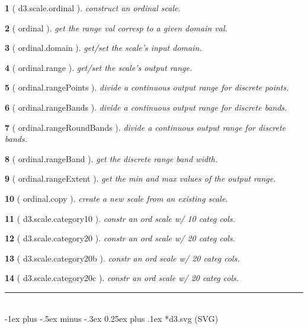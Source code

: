 \documentclass[10pt,landscape,letterpaper]{article}
\makeatletter
\newcounter{thm}
\newcommand{\hdrule}{\vspace{-4pt} \hdashrule[0.25ex]{\fill}{.5pt}{1pt}\vspace{-4pt}}
\theoremstyle{mytheoremstyle}
\newtheorem*{thm}{}
\renewcommand{\section}{\@startsection{section}{1}{0mm}%
                                {-1ex plus -.5ex minus -.3ex}%
                                {0.25ex plus .1ex}%
                                {\normalfont\large\bfseries}}
\makeatother
\begin{document}
\begin{multicols}{3}
\begin{thm} [ d3.scale.ordinal ]  construct an ordinal scale.
\end{thm}\begin{thm} [ ordinal ]  get the range val corresp to a given domain val.
\end{thm}\begin{thm} [ ordinal.domain ]  get/set the scale's input domain.
\end{thm}\begin{thm} [ ordinal.range ]  get/set the scale's output range.
\end{thm}\begin{thm} [ ordinal.rangePoints ]  divide a continuous output range for discrete points.
\end{thm}\begin{thm} [ ordinal.rangeBands ]  divide a continuous output range for discrete bands.
\end{thm}\begin{thm} [ ordinal.rangeRoundBands ]  divide a continuous output range for discrete bands.
\end{thm}\begin{thm} [ ordinal.rangeBand ]  get the discrete range band width.
\end{thm}\begin{thm} [ ordinal.rangeExtent ]  get the min and max values of the output range.
\end{thm}\begin{thm} [ ordinal.copy ]  create a new scale from an existing scale.
\end{thm}\begin{thm} [ d3.scale.category10 ]  constr an ord scale w/ 10 categ cols.
\end{thm}\begin{thm} [ d3.scale.category20 ]  constr an ord scale w/ 20 categ cols.
\end{thm}\begin{thm} [ d3.scale.category20b ]  constr an ord scale w/ 20 categ cols.
\end{thm}\begin{thm} [ d3.scale.category20c ]  constr an ord scale w/ 20 categ cols.
\end{thm}
\hrule
\hspace{1pt}\vspace*{2.75in}\\
\section*{d3.svg (SVG)}
\hdrule

\end{multicols}
\end{document}
